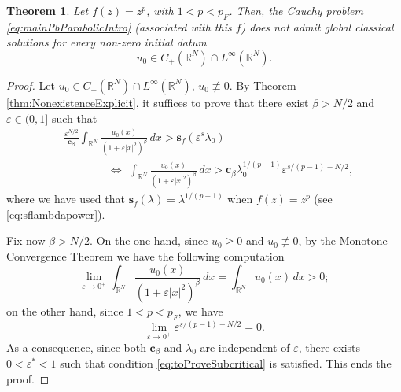 \documentclass[11pt,a4paper,reqno]{amsart}
\def \RN {\mathbb{R}^N}
\def \R {\mathbb{R}}
\def \e {\varepsilon}
\theoremstyle{definition}
\theoremstyle{plain}
\newtheorem{theorem}[definition]{Theorem}
\numberwithin{equation}{section}
\begin{document}
\begin{theorem}\label{teo3}
Let $f(z) = z^p$, with $1<p<p_F$. Then, the Cauchy problem \eqref{eq:mainPbParabolicIntro}
\emph{(}associated with this $f$\emph{)} does not admit global classical solutions \emph{for every non-zero initial datum}
$$u_0\in C_+(\mathbb{R}^N)\cap L^\infty(\mathbb{R}^N).$$
\end{theorem}
\begin{proof}
	Let $u_0\in C_+(\mathbb{R}^N)\cap L^\infty(\mathbb{R}^N),\,u_0\not\equiv 0$. By Theorem \ref{thm:NonexistenceExplicit}, it suffices to prove that there exist $\beta > N/2$ and $\varepsilon\in(0,1]$ such that\begin{equation}\label{eq:toProveSubcritical}
\begin{split}
& \frac{\e^{N/2}}{\mathbf{c}_\beta}\int_{\R^N}\frac{u_0(x)}{(1+\e|x|^2)^\beta}\,dx >\mathbf{s}_f(\e^s \lambda_0)\\
&\qquad\qquad\Longleftrightarrow\,\,
	\int_{\R^N}\frac{u_0(x)}{(1+\e|x|^2)^\beta}\,dx >\mathbf{c}_\beta \lambda_0^{1/(p-1)}\e^{s/(p-1)-N/2},
\end{split}	
\end{equation}
where we have used  that $\mathbf{s}_f(\lambda) = \lambda^{1/(p-1)}$ when $f(z) = z^p$ (see \eqref{eq:sflambdapower}).
\vspace{0.1cm}

Fix now $\beta > N/2$. On the one hand, since $u_0\geq 0$ and $u_0\not\equiv 0$, by the Monotone Convergence Theorem we have the following computation
$$\lim_{\e\to 0^+}\int_{\R^N}\frac{u_0(x)}{(1+\e|x|^2)^\beta}\,dx =
\int_{\RN}u_0(x)\,dx > 0;$$
on the other hand, since $1<p<p_F$, we have
$$\lim_{\e\to 0^+}\e^{s/(p-1)-N/2} = 0.$$
As a consequence, since both $\mathbf{c}_\beta$ and $\lambda_0$ are  independent of $\e$, there exists $0<\e^*<1$ such that
condition \eqref{eq:toProveSubcritical} is satisfied. This ends the proof.
\end{proof}
\end{document}
